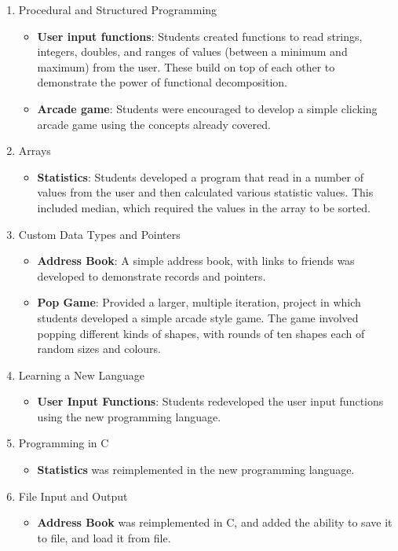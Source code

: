 \begin{enumerate}
\begin{itemize}
  \end{itemize}
  \item Procedural and Structured Programming
  \begin{itemize}[noitemsep,nolistsep]
  	\item \textbf{User input functions}: Students created functions to read strings, integers, doubles, and ranges of values (between a minimum and maximum) from the user. These build on top of each other to demonstrate the power of functional decomposition.
  	\item \textbf{Arcade game}: Students were encouraged to develop a simple clicking arcade game using the concepts already covered.
  \end{itemize}
  \item Arrays
  \begin{itemize}[noitemsep,nolistsep]
  	\item \textbf{Statistics}: Students developed a program that read in a number of values from the user and then calculated various statistic values. This included median, which required the values in the array to be sorted.
  \end{itemize}
  \item Custom Data Types and Pointers
  \begin{itemize}[noitemsep,nolistsep]
  	\item \textbf{Address Book}: A simple address book, with links to friends was developed to demonstrate records and pointers.
  	\item \textbf{Pop Game}: Provided a larger, multiple iteration, project in which students developed a simple arcade style game. The game involved popping different kinds of shapes, with rounds of ten shapes each of random sizes and colours.
  \end{itemize}
  \item Learning a New Language
  \begin{itemize}[noitemsep,nolistsep]
  	\item \textbf{User Input Functions}: Students redeveloped the user input functions using the new programming language. 
  \end{itemize}
  \item Programming in C
  \begin{itemize}[noitemsep,nolistsep]
  	\item \textbf{Statistics} was reimplemented in the new programming language.
  \end{itemize}
  \item File Input and Output
  \begin{itemize}[noitemsep,nolistsep]
  	\item \textbf{Address Book} was reimplemented in C, and added the ability to save it to file, and load it from file. 
  \end{itemize}


\end{enumerate}
